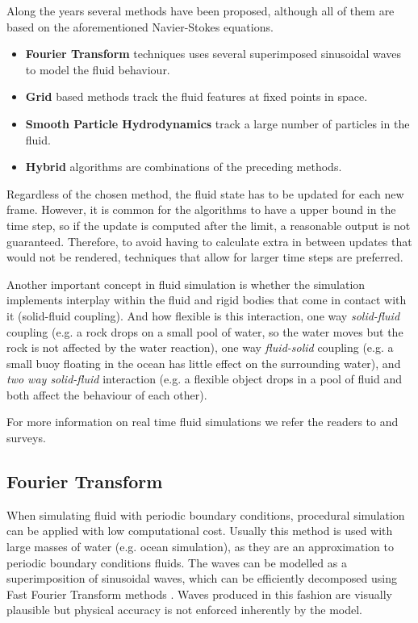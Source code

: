 Along the years several methods have been proposed, although all of them are based on the aforementioned Navier-Stokes equations.

\begin{itemize}
\item \textbf{Fourier Transform} techniques uses several superimposed sinusoidal waves to model the fluid behaviour.
\item \textbf{Grid} based methods track the fluid features at fixed points in space.
\item \textbf{Smooth Particle Hydrodynamics} track a large number of particles in the fluid.
\item \textbf{Hybrid} algorithms are combinations of the preceding methods.
\end{itemize}

Regardless of the chosen method, the fluid state has to be updated for each new frame.
However, it is common for the algorithms to have a upper bound in the time step, so if the update is computed after the limit, a reasonable output is not guaranteed.
Therefore, to avoid having to calculate extra in between updates that would not be rendered, techniques that allow for larger time steps are preferred.  

Another important concept in fluid simulation is whether the simulation implements interplay within the fluid and rigid bodies that come in contact with it (solid-fluid coupling).
And how flexible is this interaction, one way \emph{solid-fluid} coupling (e.g. a rock drops on a small pool of water, so the water moves but the rock is not affected by the water reaction), one way \emph{fluid-solid} coupling (e.g. a small buoy floating in the ocean has little effect on the surrounding water), and \emph{two way solid-fluid} interaction (e.g. a flexible object drops in a pool of fluid and both affect the behaviour of each other).

For more information on real time fluid simulations we refer the readers to \cite{Vines2012} and \cite{Ihmsen2014} surveys.

\subsection{Fourier Transform}

When simulating fluid with periodic boundary conditions, procedural simulation can be applied with low computational cost.
Usually this method is used with large masses of water (e.g. ocean simulation), as they are an approximation to periodic boundary conditions fluids.
The waves can be modelled as a superimposition of sinusoidal waves, which can be efficiently decomposed using Fast Fourier Transform methods \cite{Mastin1987}.
Waves produced in this fashion are visually plausible but physical accuracy is not enforced inherently by the model.

